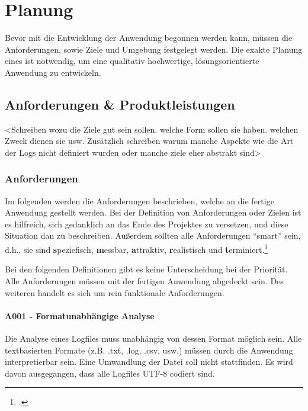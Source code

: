 
\chapter{Planung}\label{cha:Planung}
Bevor mit die Entwicklung der Anwendung begonnen werden kann, müssen die Anforderungen, sowie Ziele und Umgebung festgelegt werden. Die exakte Planung eines ist notwendig, um eine qualitativ hochwertige, lösungsorientierte Anwendung zu entwickeln.


\section{Anforderungen \& Produktleistungen}\label{sec:AnforderungenUndPLs}
<Schreiben wozu die Ziele gut sein sollen. welche Form sollen sie haben. welchen Zweck dienen sie usw. Zusätzlich schreiben warum manche Aspekte wie die Art der Logs nicht definiert wurden oder manche ziele eher abstrakt sind>

\subsection{Anforderungen}
Im folgenden werden die Anforderungen beschrieben, welche an die fertige Anwendung gestellt werden. Bei der Definition von Anforderungen oder Zielen ist es hilfreich, sich gedanklich an das Ende des Projektes zu versetzen, und diese Situation dan zu beschreiben. Außerdem sollten alle Anforderungen "`smart"' sein, d.h., sie sind \textbf{s}peziefisch, \textbf{m}essbar, \textbf{a}ttraktiv, \textbf{r}ealistisch und \textbf{t}erminiert.\footcite[Vgl.][S. 48]{Bauer.2014}

Bei den folgenden Definitionen gibt es keine Unterscheidung bei der Priorität. Alle Anforderungen müssen mit der fertigen Anwendung abgedeckt sein. Des weiteren handelt es sich um rein funktionale Anforderungen. 

\subsubsection{A001 - Formatunabhängige Analyse}\label{subsubsec:A001}
Die Analyse eines Logfiles muss unabhängig von dessen Format möglich sein. Alle textbasierten Formate (z.B. .txt, .log, .csv, usw.) müssen durch die Anwendung interpretierbar sein. Eine Umwandlung der Datei soll nicht stattfinden. Es wird davon ausgegangen, dass alle Logfiles UTF-8 codiert sind.

